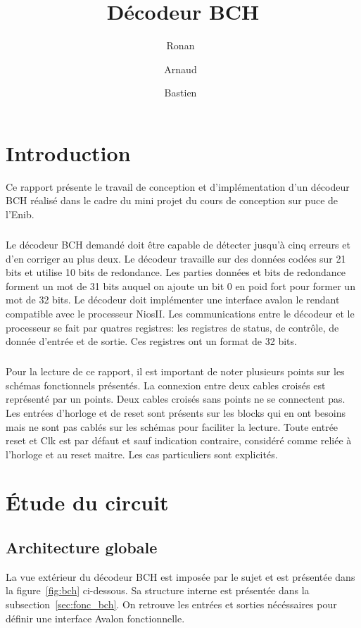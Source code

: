 \documentclass[a4paper, 11pt, svgnames]{report}
\title{Décodeur BCH}
\author{Ronan~\bsc{Le Guillou} \and Arnaud~\bsc{Levaufre} \and Bastien~\bsc{Orivel}}
\begin{document}
    \maketitle
    \tableofcontents
    \listoffigures

    \chapter{Introduction}

    Ce rapport présente le travail de conception et d'implémentation d'un
    décodeur BCH réalisé dans le cadre du mini projet du cours de conception
    sur puce de l'Enib.

    \paragraph{}
    Le décodeur BCH demandé doit être capable de détecter jusqu'à cinq erreurs
    et d'en corriger au plus deux. Le décodeur travaille sur des données codées
    sur 21 bits et utilise 10 bits de redondance. Les parties données et bits de
    redondance forment un mot de 31 bits auquel on ajoute un bit 0 en poid fort
    pour former un mot de 32 bits. Le décodeur doit implémenter une interface
    avalon le rendant compatible avec le processeur NiosII. Les communications
    entre le décodeur et le processeur se fait par quatres registres: les
    registres de status, de contrôle, de donnée d'entrée et de sortie. Ces
    registres ont un format de 32 bits.

    \paragraph{}
    Pour la lecture de ce rapport, il est important de noter plusieurs points
    sur les schémas fonctionnels présentés. La connexion entre deux cables
    croisés est représenté par un points. Deux cables croisés sans points ne se
    connectent pas. Les entrées d'horloge et de reset sont présents sur les
    blocks qui en ont besoins mais ne sont pas cablés sur les schémas pour
    faciliter la lecture. Toute entrée reset et Clk est par défaut et sauf
    indication contraire, considéré comme reliée à l'horloge et au reset
    maitre. Les cas particuliers sont explicités.

    \chapter{Étude du circuit}
        \section{Architecture globale}
        La vue extérieur du décodeur BCH est imposée par le sujet et est
        présentée dans la figure~\ref{fig:bch} ci-dessous. Sa structure
        interne est présentée dans la subsection~\ref{sec:fonc_bch}. On
        retrouve les entrées et sorties nécéssaires pour définir une
        interface Avalon fonctionnelle.
\end{document}
